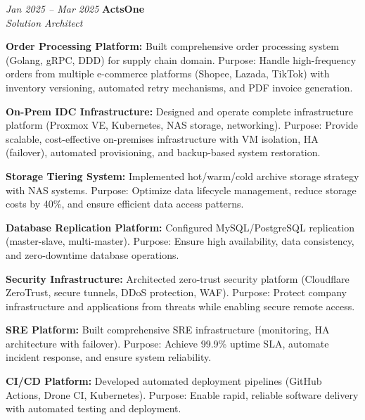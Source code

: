 \begin{twocolentry}{\textit{Jan 2025 -- Mar 2025}}
    \textbf{ActsOne} \\[4pt]
    \textit{Solution Architect}
\end{twocolentry}
\begin{onecolentry}
    \begin{highlights}
        \item \textbf{Order Processing Platform:} Built comprehensive order processing system (Golang, gRPC, DDD) for supply chain domain. Purpose: Handle high-frequency orders from multiple e-commerce platforms (Shopee, Lazada, TikTok) with inventory versioning, automated retry mechanisms, and PDF invoice generation.
        \item \textbf{On-Prem IDC Infrastructure:} Designed and operate complete infrastructure platform (Proxmox VE, Kubernetes, NAS storage, networking). Purpose: Provide scalable, cost-effective on-premises infrastructure with VM isolation, HA (failover), automated provisioning, and backup-based system restoration.
        \item \textbf{Storage Tiering System:} Implemented hot/warm/cold archive storage strategy with NAS systems. Purpose: Optimize data lifecycle management, reduce storage costs by 40\%, and ensure efficient data access patterns.
        \item \textbf{Database Replication Platform:} Configured MySQL/PostgreSQL replication (master-slave, multi-master). Purpose: Ensure high availability, data consistency, and zero-downtime database operations.
        \item \textbf{Security Infrastructure:} Architected zero-trust security platform (Cloudflare ZeroTrust, secure tunnels, DDoS protection, WAF). Purpose: Protect company infrastructure and applications from threats while enabling secure remote access.
        \item \textbf{SRE Platform:} Built comprehensive SRE infrastructure (monitoring, HA architecture with failover). Purpose: Achieve 99.9\% uptime SLA, automate incident response, and ensure system reliability.
        \item \textbf{CI/CD Platform:} Developed automated deployment pipelines (GitHub Actions, Drone CI, Kubernetes). Purpose: Enable rapid, reliable software delivery with automated testing and deployment.
    \end{highlights}
\end{onecolentry}
\vspace{0.2 cm}

